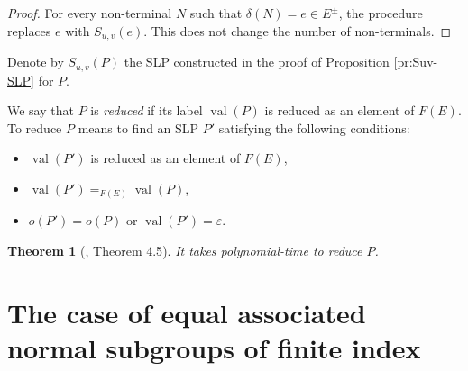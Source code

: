 \documentclass[12pt,oneside]{amsart}
\newtheorem{theorem}{Theorem}[section]
\theoremstyle{definition}
\theoremstyle{case}
\DeclareMathOperator{\val}{val}
\begin{document}
\begin{proof}
For every non-terminal $N$ such that $\delta(N)=e\in E^\pm$,
the procedure replaces $e$ with $S_{u,v}(e)$.
This does not change the number of non-terminals.
\end{proof}

Denote by $S_{u,v}(P)$ the SLP constructed in the proof of 
Proposition \ref{pr:Suv-SLP} for $P$.

We say that $P$ is \emph{reduced} if its label $\val(P)$ is reduced
as an element of $F(E)$. To reduce $P$ means to find
an SLP $P'$ satisfying the following conditions:
\begin{itemize}
\item 
$\val(P')$ is reduced as an element of $F(E)$,
\item 
$\val(P') =_{F(E)} \val(P)$,
\item 
$o(P')=o(P)$ or $\val(P') = \varepsilon$.
\end{itemize}


\begin{theorem}[{{\cite{Lohrey:2004}, Theorem 4.5}}]\label{th:reducing-SLP}
It takes polynomial-time to reduce $P$.
\end{theorem}


\section{The case of equal associated normal subgroups of finite index}
\label{se:case1}
\end{document}
